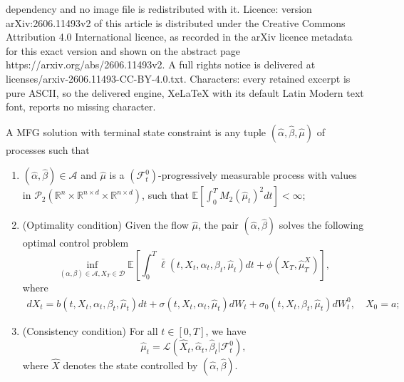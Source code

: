 \documentclass[10pt,a4paper]{amsart}
\begin{document}
dependency and no image file is redistributed with it. Licence: version arXiv:2606.11493v2 of this article is distributed under the Creative Commons Attribution 4.0 International licence, as recorded in the arXiv licence metadata for this exact version and shown on the abstract page https://arxiv.org/abs/2606.11493v2. A full rights notice is delivered at licenses/arxiv-2606.11493-CC-BY-4.0.txt. Characters: every retained excerpt is pure ASCII, so the delivered engine, XeLaTeX with its default Latin Modern text font, reports no missing character.
\begin{defi} \label{def-MFG-constraint} A MFG solution with terminal state constraint is any tuple $(\hat \alpha, \hat\beta, \hat \mu)$ of processes such that
\begin{enumerate}
\item $(\hat\alpha, \hat\beta) \in \mathcal A$ and  $\hat \mu$ is a $(\mathcal F_t ^0)$-progressively measurable process with values in $\mathcal{P}_2(\mathbb R^n \times \mathbb R^{n\times d} \times \mathbb R^{n\times d})$, such that $\mathbb E \left[\int_0^T M_2(\hat \mu_t)^2 dt\right]<\infty$;
\item (Optimality condition) Given the flow $\hat \mu$, the pair $(\hat \alpha, \hat \beta)$ solves the following optimal control problem
\begin{equation}
\label{forward CN}
     \inf_{(\alpha, \beta)\in \mathcal A,  X_T \in \mathcal D} \mathbb{E}\left[\int _0^T \bar{\ell}(t,X_t,  \alpha_t, \beta_t, \hat\mu _t)dt+\phi(X_T,\hat\mu^X_T)\right],
\end{equation}
where
\begin{equation}
\begin{aligned}
    dX_t=b(t,X_t,  \alpha_t, \beta_t, \hat\mu_t)dt+\sigma(t,X_t, \alpha_t, \hat\mu_t)dW_t
    +\sigma_0(t,X_t, \beta_t, \hat\mu_t)dW_t^0, \quad  X_0=a;
 \end{aligned}   
\end{equation}
\item (Consistency condition)  For all $t\in [0,T]$, we have \[\hat\mu_t=\mathcal{L}(\hat X_t, \hat\alpha_t, \hat\beta_t|\mathcal{F}_t^0),\] where $\hat X$ denotes the state controlled by $(\hat\alpha, \hat\beta)$.    \end{enumerate}
\end{defi}
\end{document}
